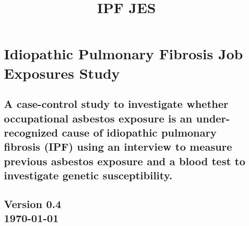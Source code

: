 \documentclass[a4paper,10pt]{article}
\title{\bf IPF JES}
\date{}
\begin{document}
\pagestyle{fancy} 


\maketitle



\section*{Idiopathic Pulmonary Fibrosis Job Exposures Study}
 \subsection*{A case-control study to investigate whether occupational asbestos exposure is an under-recognized cause of idiopathic pulmonary fibrosis (IPF) using an interview to measure previous
asbestos exposure and a blood test to investigate genetic susceptibility.}


\begin{centering}
\subsection*{Version 0.4 \\ \today}
\end{centering}
\end{document}
